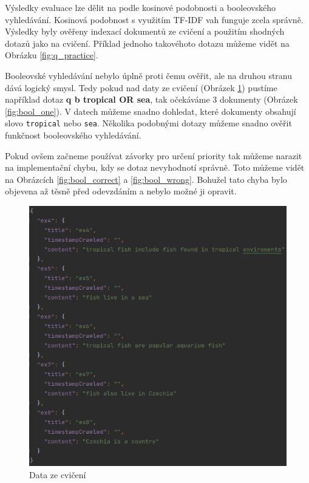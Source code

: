 \documentclass[12pt, letterpaper]{article}
\begin{document}
Výsledky evaluace lze dělit na podle kosinové podobnosti a booleovského vyhledávání. Kosinová podobnost s využitím
TF-IDF vah funguje zcela správně. Výsledky byly ověřeny indexací dokumentů ze cvičení a použitím shodných dotazů
jako na cvičení. Příklad jednoho takovéhoto dotazu můžeme vidět na Obrázku \ref{fig:q_practice}.

Booleovské vyhledávání nebylo úplně proti čemu ověřit, ale na druhou stranu dává logický smysl. Tedy pokud nad
daty ze cvičení (Obrázek \ref{fig:data}) pustíme například dotaz \textbf{q b tropical OR sea}, tak očekáváme 3
dokumenty (Obrázek \ref{fig:bool_one}). V datech můžeme snadno dohledat, které dokumenty obsahují slovo
\texttt{tropical} nebo \texttt{sea}. Několika podobnými dotazy můžeme snadno ověřit funkčnost booleovského vyhledávání.

Pokud ovšem začneme používat závorky pro určení priority tak můžeme narazit na implementační chybu, kdy se dotaz
nevyhodnotí správně. Toto můžeme vidět na Obrázcích \ref{fig:bool_correct} a \ref{fig:bool_wrong}. Bohužel tato
chyba bylo objevena až těsně před odevzdáním a nebylo možné ji opravit.

\begin{figure}[H]
    \centering
    \includegraphics[width=\linewidth]{img/data}
    \caption{Data ze cvičení}
    \label{fig:data}
\end{figure}
\end{document}
